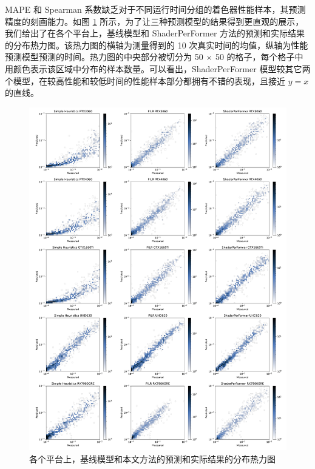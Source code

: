MAPE 和 Spearman 系数缺乏对于不同运行时间分组的着色器性能样本，其预测精度的刻画能力。如图 \ref{fig:archHeatmap} 所示，为了让三种预测模型的结果得到更直观的展示，我们给出了在各个平台上，基线模型和 ShaderPerFormer 方法的预测和实际结果的分布热力图。该热力图的横轴为测量得到的 10 次真实时间的均值，纵轴为性能预测模型预测的时间。热力图的中央部分被切分为 50 $\times$ 50 的格子，每个格子中用颜色表示该区域中分布的样本数量。可以看出，ShaderPerFormer 模型较其它两个模型，在较高性能和较低时间的性能样本部分都拥有不错的表现，且接近 $y=x$ 的直线。

\begin{figure}[htbp]
  \centering
  \includegraphics[width=1.0\linewidth]{figures/archHeatmapRefined.pdf}
  \caption{各个平台上，基线模型和本文方法的预测和实际结果的分布热力图}
  \label{fig:archHeatmap}
\end{figure}

